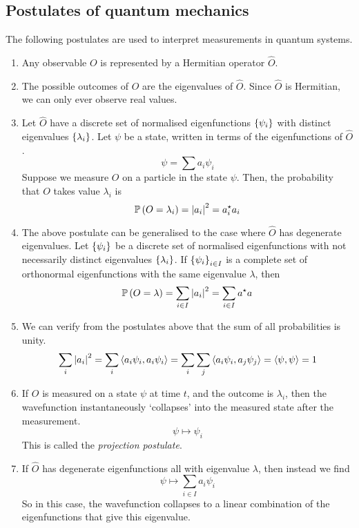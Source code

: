 \subsection{Postulates of quantum mechanics}
The following postulates are used to interpret measurements in quantum systems.
\begin{enumerate}
	\item Any observable \( O \) is represented by a Hermitian operator \( \hat O \).
	\item The possible outcomes of \( O \) are the eigenvalues of \( \hat O \).
	      Since \( \hat O \) is Hermitian, we can only ever observe real values.
	\item Let \( \hat O \) have a discrete set of normalised eigenfunctions \( \qty{\psi_i} \) with distinct eigenvalues \( \qty{\lambda_i} \).
	      Let \( \psi \) be a state, written in terms of the eigenfunctions of \( \hat O \).
	      \[
		      \psi = \sum a_i \psi_i
	      \]
	      Suppose we measure \( O \) on a particle in the state \( \psi \).
	      Then, the probability that \( O \) takes value \( \lambda_i \) is
	      \[
		      \mathbb{P}\left({O = \lambda_i}\right) = \abs{a_i}^2 = a_i^\star a_i
	      \]
	\item The above postulate can be generalised to the case where \( \hat O \) has degenerate eigenvalues.
	      Let \( \qty{\psi_i} \) be a discrete set of normalised eigenfunctions with not necessarily distinct eigenvalues \( \qty{\lambda_i} \).
	      If \( \qty{\psi_i}_{i \in I} \) is a complete set of orthonormal eigenfunctions with the same eigenvalue \( \lambda \), then
	      \[
		      \mathbb{P}\left({O = \lambda}\right) = \sum_{i \in I} \abs{a_i}^2 = \sum_{i \in I} a^\star a
	      \]
	\item We can verify from the postulates above that the sum of all probabilities is unity.
	      \[
		      \sum_i \abs{a_i}^2 = \sum_i \left\langle{a_i \psi_i, a_i \psi_i}\right\rangle = \sum_i \sum_j \left\langle{a_i \psi_i, a_j \psi_j}\right\rangle = \left\langle{\psi, \psi}\right\rangle = 1
	      \]
	\item If \( O \) is measured on a state \( \psi \) at time \( t \), and the outcome is \( \lambda_i \), then the wavefunction instantaneously `collapses' into the measured state after the measurement.
	      \[
		      \psi \mapsto \psi_i
	      \]
	      This is called the \textit{projection postulate}.
	\item If \( \hat O \) has degenerate eigenfunctions all with eigenvalue \( \lambda \), then instead we find
	      \[
		      \psi \mapsto \sum_{i \in I} a_i \psi_i
	      \]
	      So in this case, the wavefunction collapses to a linear combination of the eigenfunctions that give this eigenvalue.
\end{enumerate}

